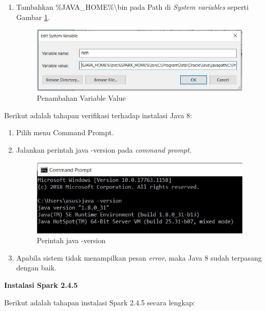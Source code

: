 \documentclass[a4paper,twoside]{article}
\begin{document}
\begin{enumerate}
\begin{enumerate}
\newpage
\item Tambahkan \textsf{\%JAVA\_HOME\%\textbackslash bin} pada Path di \textit{System variables} seperti Gambar \ref{fig:spark_instal_5}.

\begin{figure}[H]
	\centering
	\includegraphics[scale=0.8]{spark_instal_5}
	\caption{Penambahan Variable Value}
	\label{fig:spark_instal_5}
\end{figure}


\end{enumerate}

\noindent Berikut adalah tahapan verifikasi terhadap instalasi Java 8:

\begin{enumerate}

\item Pilih menu Command Prompt.

\item Jalankan perintah java -version pada \textit{command prompt}.

\begin{figure}[H]
	\centering
	\includegraphics[scale=1]{instalasi_java}
	\caption{Perintah java -version}
	\label{fig:instalasi_java}
\end{figure}

\item Apabila sistem tidak menampilkan pesan \textit{error}, maka Java 8 sudah terpasang dengan baik.

\end{enumerate}

\textbf{Instalasi Spark 2.4.5}

Berikut adalah tahapan instalasi Spark 2.4.5 secara lengkap:


\end{enumerate}
\end{document}
